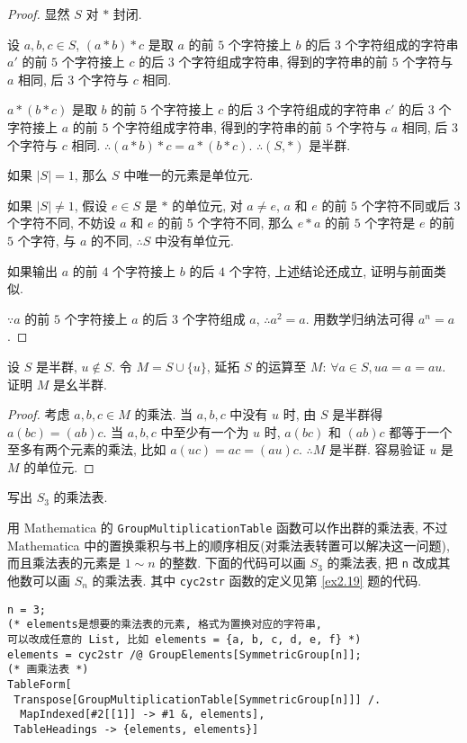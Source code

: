 \documentclass[color=black,device=normal,lang=cn,mode=geye]{elegantnote}
\begin{document}
\begin{proof}
    显然 $S$ 对 $*$ 封闭.

    设 $a,b,c\in S$, $(a*b)*c$ 是取 $a$ 的前 $5$ 个字符接上 $b$ 的后 $3$ 个字符组成的字符串 $a'$ 的前 $5$ 个字符接上 $c$ 的后 $3$ 个字符组成字符串, 得到的字符串的前 $5$ 个字符与 $a$ 相同, 后 $3$ 个字符与 $c$ 相同.
    
    $a*(b*c)$ 是取 $b$ 的前 $5$ 个字符接上 $c$ 的后 $3$ 个字符组成的字符串 $c'$ 的后 $3$ 个字符接上 $a$ 的前 $5$ 个字符组成字符串, 得到的字符串的前 $5$ 个字符与 $a$ 相同, 后 $3$ 个字符与 $c$ 相同. $\therefore(a*b)*c=a*(b*c)$. $\therefore(S,*)$ 是半群.

    如果 $|S|=1$, 那么 $S$ 中唯一的元素是单位元.
    
    如果 $|S|\neq1$, 假设 $e\in S$ 是 $*$ 的单位元, 对 $a\neq e$, $a$ 和 $e$ 的前 $5$ 个字符不同或后 $3$ 个字符不同, 不妨设 $a$ 和 $e$ 的前 $5$ 个字符不同, 那么 $e*a$ 的前 $5$ 个字符是 $e$ 的前 $5$ 个字符, 与 $a$ 的不同, $\therefore S$ 中没有单位元.

    如果输出 $a$ 的前 $4$ 个字符接上 $b$ 的后 $4$ 个字符, 上述结论还成立, 证明与前面类似.

    $\because a$ 的前 $5$ 个字符接上 $a$ 的后 $3$ 个字符组成 $a$, $\therefore a^2=a$. 用数学归纳法可得 $a^n=a$.
\end{proof}
\begin{exercisec}[5.1.5]
    设 $S$ 是半群, $u\notin S$. 令 $M=S\cup\{u\}$, 延拓 $S$ 的运算至 $M$: $\forall a\in S,ua=a=au$. 证明 $M$ 是幺半群.
\end{exercisec}
\begin{proof}
    考虑 $a,b,c\in M$ 的乘法. 当 $a,b,c$ 中没有 $u$ 时, 由 $S$ 是半群得 $a(bc)=(ab)c$. 当 $a,b,c$ 中至少有一个为 $u$ 时, $a(bc)$ 和 $(ab)c$ 都等于一个至多有两个元素的乘法, 比如 $a(uc)=ac=(au)c$. $\therefore M$ 是半群. 容易验证 $u$ 是 $M$ 的单位元.
\end{proof}
\begin{exercisec}[5.2.1]
    写出 $S_3$ 的乘法表.
\end{exercisec}
\begin{solution}
    用 Mathematica 的 \verb|GroupMultiplicationTable| 函数可以作出群的乘法表, 不过 Mathematica 中的置换乘积与书上的顺序相反(对乘法表转置可以解决这一问题), 而且乘法表的元素是 $1\sim n$ 的整数. 下面的代码可以画 $S_3$ 的乘法表, 把 \verb|n| 改成其他数可以画 $S_n$ 的乘法表. 其中 \verb|cyc2str| 函数的定义见第 \ref{ex2.19} 题的代码.
    \begin{verbatim}
n = 3;
(* elements是想要的乘法表的元素, 格式为置换对应的字符串,
可以改成任意的 List, 比如 elements = {a, b, c, d, e, f} *)
elements = cyc2str /@ GroupElements[SymmetricGroup[n]];
(* 画乘法表 *)
TableForm[
 Transpose[GroupMultiplicationTable[SymmetricGroup[n]]] /. 
  MapIndexed[#2[[1]] -> #1 &, elements], 
 TableHeadings -> {elements, elements}]\end{verbatim}
\end{solution}
\end{document}
